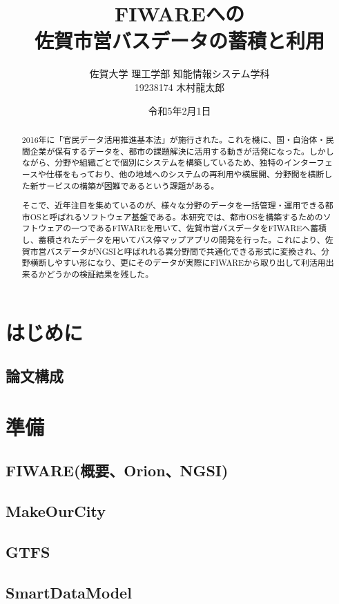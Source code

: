 \documentclass[a4paper, 12pt]{jsreport}
\title{FIWAREへの\\
佐賀市営バスデータの蓄積と利用
}
\author{佐賀大学
理工学部
知能情報システム学科\\
19238174
木村龍太郎}
\date{令和5年2月1日}
\begin{document}
  \maketitle


  \begin{abstract}
    \par 2016年に「官民データ活用推進基本法」が施行された。これを機に、国・自治体・民間企業が保有するデータを、都市の課題解決に活用する動きが活発になった。しかしながら、分野や組織ごとで個別にシステムを構築しているため、独特のインターフェースや仕様をもっており、他の地域へのシステムの再利用や横展開、分野間を横断した新サービスの構築が困難であるという課題がある。
    \par そこで、近年注目を集めているのが、様々な分野のデータを一括管理・運用できる都市OSと呼ばれるソフトウェア基盤である。本研究では、都市OSを構築するためのソフトウェアの一つであるFIWAREを用いて、佐賀市営バスデータをFIWAREへ蓄積し、蓄積されたデータを用いてバス停マップアプリの開発を行った。これにより、佐賀市営バスデータがNGSIと呼ばれれる異分野間で共通化できる形式に変換され、分野横断しやすい形になり、更にそのデータが実際にFIWAREから取り出して利活用出来るかどうかの検証結果を残した。
  \end{abstract}

  \tableofcontents

  \chapter{はじめに}
  \section{論文構成}


  \chapter{準備}


  \section{FIWARE(概要、Orion、NGSI)}
  \section{MakeOurCity}
  \section{GTFS}
  \section{SmartDataModel}
\end{document}
